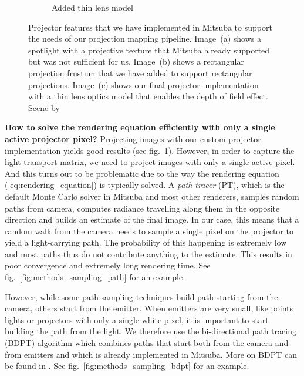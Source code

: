 \begin{figure}[]
\begin{subfigure}[b]{0.32\textwidth}
        \caption{Added thin lens model}
        \vspace*{5mm}
        \label{fig:methods_projector_features_thin_lens}
    \end{subfigure}
    \caption{Projector features that we have implemented in Mitsuba to support the needs of our projection mapping pipeline. Image~(a) shows  a spotlight with a projective texture that Mitsuba already supported but was not sufficient for us. Image~(b) shows a rectangular projection frustum that we have added to support rectangular projections. Image~(c) shows our final projector implementation with a thin lens optics model that enables the depth of field effect. Scene by \citet{Bitterli16}}
    \label{fig:methods_projector_features}
\end{figure}

\textbf{How to solve the rendering equation efficiently with only a single active projector pixel?} Projecting images with our custom projector implementation yields good results (see fig.~\ref{fig:methods_projector_features_thin_lens}). However, in order to capture the light transport matrix, we need to project images with only a single active pixel. And this turns out to be problematic due to the way the rendering equation (\ref{eq:rendering_equation}) is typically solved. A \textit{path tracer} (PT), which is the default Monte Carlo solver in Mitsuba and most other renderers, samples random paths from camera, computes radiance travelling along them in the opposite direction and builds an estimate of the final image. In our case, this means that a random walk from the camera needs to sample a single pixel on the projector to yield a light-carrying path. The probability of this happening is extremely low and most paths thus do not contribute anything to the estimate. This results in poor convergence and extremely long rendering time. See fig.~\ref{fig:methods_sampling_path} for an example.

However, while some path sampling techniques build path starting from the camera, others start from the emitter. When emitters are very small, like points lights or projectors with only a single white pixel, it is important to start building the path from the light. We therefore use the bi-directional path tracing (BDPT) algorithm which combines paths that start both from the camera and from emitters and which is already implemented in Mitsuba. More on BDPT can be found in \citet{Veach1997}. See fig.~\ref{fig:methods_sampling_bdpt} for an example.

